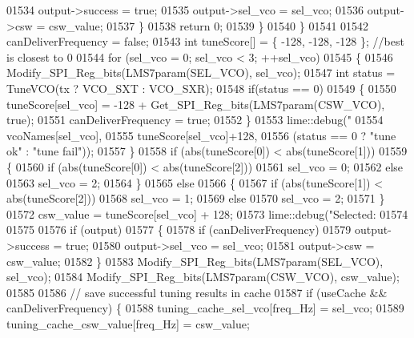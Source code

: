 \begin{DoxyCode}
{{{{{{{{{{{{{{{{{{{{{{{{{{{{{{{{{{{{{{{{{{{{{{01534                 output->success = \textcolor{keyword}{true};
01535                 output->sel_vco = sel\_vco;
01536                 output->csw = csw\_value;
01537             \}
01538             \textcolor{keywordflow}{return} 0;
01539         \}
01540     \}
01541 
01542     canDeliverFrequency = \textcolor{keyword}{false};
01543     \textcolor{keywordtype}{int} tuneScore[] = \{ -128, -128, -128 \}; \textcolor{comment}{//best is closest to 0}
01544     \textcolor{keywordflow}{for} (sel\_vco = 0; sel\_vco < 3; ++sel\_vco)
01545     \{
01546         Modify_SPI_Reg_bits(LMS7param(SEL_VCO), sel\_vco);
01547         \textcolor{keywordtype}{int} status = TuneVCO(tx ? VCO_SXT : VCO_SXR);
01548         \textcolor{keywordflow}{if}(status == 0)
01549         \{
01550             tuneScore[sel\_vco] = -128 + Get_SPI_Reg_bits(LMS7param(CSW_VCO), \textcolor{keyword}{true});
01551             canDeliverFrequency = \textcolor{keyword}{true};
01552         \}
01553         lime::debug(\textcolor{stringliteral}{"%
01554                     vcoNames[sel\_vco],
01555                     tuneScore[sel\_vco]+128,
01556                     (status == 0 ? \textcolor{stringliteral}{"tune ok"} : \textcolor{stringliteral}{"tune fail"}));
01557     \}
01558     \textcolor{keywordflow}{if} (abs(tuneScore[0]) < abs(tuneScore[1]))
01559     \{
01560         \textcolor{keywordflow}{if} (abs(tuneScore[0]) < abs(tuneScore[2]))
01561             sel\_vco = 0;
01562         \textcolor{keywordflow}{else}
01563             sel\_vco = 2;
01564     \}
01565     \textcolor{keywordflow}{else}
01566     \{
01567         \textcolor{keywordflow}{if} (abs(tuneScore[1]) < abs(tuneScore[2]))
01568             sel\_vco = 1;
01569         \textcolor{keywordflow}{else}
01570             sel\_vco = 2;
01571     \}
01572     csw\_value = tuneScore[sel\_vco] + 128;
01573     lime::debug(\textcolor{stringliteral}{"Selected: %
01574 
01575 
01576     \textcolor{keywordflow}{if} (output)
01577     \{
01578         \textcolor{keywordflow}{if} (canDeliverFrequency)
01579             output->success = \textcolor{keyword}{true};
01580         output->sel_vco = sel\_vco;
01581         output->csw = csw\_value;
01582     \}
01583     Modify_SPI_Reg_bits(LMS7param(SEL_VCO), sel\_vco);
01584     Modify_SPI_Reg_bits(LMS7param(CSW_VCO), csw\_value);
01585 
01586     \textcolor{comment}{// save successful tuning results in cache}
01587     \textcolor{keywordflow}{if} (useCache && canDeliverFrequency) \{
01588         tuning\_cache\_sel\_vco[freq\_Hz] = sel\_vco;
01589         tuning\_cache\_csw\_value[freq\_Hz] = csw\_value;
}}}}}}}}}}}}}}}}}}}}}}}}}}}}}}}}}}}}}}}}}}}}}}}}
\end{DoxyCode}
